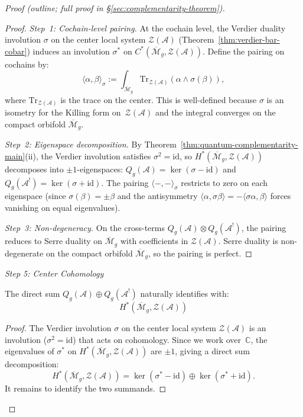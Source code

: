 \begin{proof}[Proof (outline; full proof in \S\textup{\ref{sec:complementarity-theorem}})]
\begin{proof}
\emph{Step~1: Cochain-level pairing.}
At the cochain level, the Verdier duality involution $\sigma$
on the center local system $\mathcal{Z}(\mathcal{A})$
(Theorem~\ref{thm:verdier-bar-cobar}) induces an involution
$\sigma^*$ on $C^*(\overline{\mathcal{M}}_g, \mathcal{Z}(\mathcal{A}))$.
Define the pairing on cochains by:
\[
\langle \alpha, \beta \rangle_{\sigma}
:= \int_{\overline{\mathcal{M}}_g}
\mathrm{Tr}_{\mathcal{Z}(\mathcal{A})}(\alpha \wedge \sigma(\beta)),
\]
where $\mathrm{Tr}_{\mathcal{Z}(\mathcal{A})}$ is the trace on the
center.  This is well-defined because $\sigma$ is an isometry for the
Killing form on~$\mathcal{Z}(\mathcal{A})$ and the integral converges
on the compact orbifold $\overline{\mathcal{M}}_g$.

\emph{Step~2: Eigenspace decomposition.}
By Theorem~\ref{thm:quantum-complementarity-main}(ii), the Verdier
involution satisfies $\sigma^2 = \mathrm{id}$, so
$H^*(\overline{\mathcal{M}}_g, \mathcal{Z}(\mathcal{A}))$ decomposes
into $\pm 1$-eigenspaces:
$Q_g(\mathcal{A}) = \ker(\sigma - \mathrm{id})$ and
$Q_g(\mathcal{A}^!) = \ker(\sigma + \mathrm{id})$.
The pairing $\langle -, - \rangle_{\sigma}$ restricts to zero on
each eigenspace (since $\sigma(\beta) = \pm\beta$ and the
antisymmetry $\langle \alpha, \sigma\beta \rangle
= -\langle \sigma\alpha, \beta \rangle$ forces vanishing on
equal eigenvalues).

\emph{Step~3: Non-degeneracy.}
On the cross-terms $Q_g(\mathcal{A}) \otimes Q_g(\mathcal{A}^!)$,
the pairing reduces to Serre duality on $\overline{\mathcal{M}}_g$
with coefficients in $\mathcal{Z}(\mathcal{A})$.  Serre duality is
non-degenerate on the compact orbifold $\overline{\mathcal{M}}_g$,
so the pairing is perfect.
\end{proof}

\emph{Step 5: Center Cohomology}

\begin{lemma}\label{lem:center-cohomology}
The direct sum $Q_g(\mathcal{A}) \oplus Q_g(\mathcal{A}^!)$ naturally identifies with:
\[H^*(\overline{\mathcal{M}}_g, \mathcal{Z}(\mathcal{A}))\]
\end{lemma}

\begin{proof}
The Verdier involution $\sigma$ on the center local system
$\mathcal{Z}(\mathcal{A})$ is an involution ($\sigma^2 = \mathrm{id}$)
that acts on cohomology.  Since we work over~$\mathbb{C}$, the
eigenvalues of $\sigma^*$ on
$H^*(\overline{\mathcal{M}}_g, \mathcal{Z}(\mathcal{A}))$ are $\pm 1$,
giving a direct sum decomposition:
\[
H^*(\overline{\mathcal{M}}_g, \mathcal{Z}(\mathcal{A}))
= \ker(\sigma^* - \mathrm{id})
\oplus \ker(\sigma^* + \mathrm{id}).
\]
It remains to identify the two summands.


\end{proof}
\end{proof}
